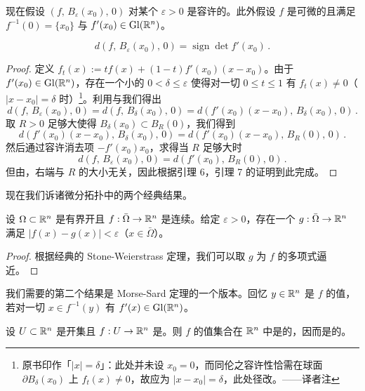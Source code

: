 现在假设 $(f,\,B_{\varepsilon}(x_0),\,0)$ 对某个 $\varepsilon>0$ 是容许的。此外假设 $f$ 是可微的且满足
$f^{-1}(0)=\{x_0\}$ 与 $f'(x_0)\in\mathrm{Gl}(\mathbb{R}^n)$。

\begin{lemma}\label{lem:brouwer-degree-regular}
\begin{equation*}
d(f,\,B_{\varepsilon}(x_0),\,0)=\operatorname{sign}\det f'(x_0)\,.
\end{equation*}
\end{lemma}

\begin{proof}
定义 $f_t(x):=tf(x)+(1-t)f'(x_0)(x-x_0)$。由于 $f'(x_0)\in\mathrm{Gl}(\mathbb{R}^n)$，存在一个小的 $0<\delta\leq\varepsilon$ 使得对一切 $0\leq t\leq 1$ 有 $f_t(x)\neq 0$（$|x-x_{0}|=\delta$ 时）\footnote{原书印作「$|x|=\delta$」：此处并未设 $x_{0}=0$，而同伦之容许性恰需在球面 $\partial B_{\delta}(x_{0})$ 上 $f_{t}(x)\neq0$，故应为 $|x-x_{0}|=\delta$，此处径改。——译者注}。利用\trExcision{}与\trHomotopy\trInvariance{}我们得出
\[d(f,\,B_{\varepsilon}(x_0),\,0)=d(f,\,B_{\delta}(x_0),\,0)=d(f'(x_0)(x-x_0),\,B_{\delta}(x_0),\,0)\,.\]
取 $R>0$ 足够大使得 $B_{\delta}(x_0)\subset B_R(0)$，我们得到
\[d(f'(x_0)(x-x_0),\,B_{\delta}(x_0),\,0)=d(f'(x_0)(x-x_0),\,B_R(0),\,0)\,.\]
然后通过容许\trHomotopy{}消去项 $-f'(x_0)x_0$，求得当 $R$ 足够大时
\[d(f,\,B_{\varepsilon}(x_0),\,0)=d(f'(x_0),\,B_R(0),\,0)\,.\]
但由\trExcision，右端与 $R$ 的大小无关，因此根据引理 6，引理 7 的证明到此完成。
\end{proof}

现在我们诉诸微分拓扑中的两个经典结果。

\begin{lemma}\label{lem:stone-weierstrass}
设 $\Omega\subset\mathbb{R}^n$ 是有界开\trDomain{}且 $f:\bar{\Omega}\to\mathbb{R}^n$ 是连续\trMapping。给定 $\varepsilon>0$，存在一个\trSmooth{}\trMapping{} $g:\bar{\Omega}\to\mathbb{R}^n$ 满足
$|f(x)-g(x)|<\varepsilon$（$x\in\bar{\Omega}$）。
\end{lemma}

\begin{proof}
根据经典的 Stone-Weierstrass 定理，我们可以取 $g$ 为 $f$ 的多项式逼近。
\end{proof}

我们需要的第二个结果是 Morse-Sard 定理的一个版本。回忆 $y\in\mathbb{R}^n$ 是 $f$ 的\trRegular{}值，若对一切 $x\in f^{-1}(y)$ 有 $f'(x)\in\mathrm{Gl}(\mathbb{R}^n)$。

\begin{lemma}\label{lem:morse-sard}
设 $U\subset\mathbb{R}^n$ 是开集且 $f:U\to\mathbb{R}^n$ 是\trSmooth{}\trMapping。则 $f$ 的\trRegular{}值集合在 $\mathbb{R}^n$ 中是\trResidual{}的，因而是\trDense{}的。
\end{lemma}

